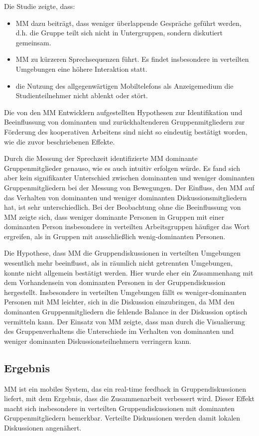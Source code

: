 Die Studie zeigte, dass:

\begin{itemize}
  \item MM dazu beiträgt, dass weniger überlappende Gespräche geführt werden, d.h. die
Gruppe teilt sich nicht in Untergruppen, sondern diskutiert gemeinsam.
  \item MM zu kürzeren Sprechsequenzen führt. Es findet insbesondere in verteilten
Umgebungen eine höhere Interaktion statt.
  \item die Nutzung des allgegenwärtigen Mobiltelefons als Anzeigemedium die
Studienteilnehmer nicht ablenkt oder stört.

\end{itemize}

Die von den MM Entwicklern aufgestellten Hypothesen zur Identifikation und
Beeinflussung von dominanten und zurückhaltenderen Gruppenmitgliedern zur
Förderung des kooperativen Arbeitens sind nicht so eindeutig bestätigt worden,
wie die zuvor beschriebenen Effekte.

Durch die Messung der Sprechzeit identifizierte MM dominante Gruppenmitglieder
genauso, wie es auch intuitiv erfolgen würde. Es fand sich aber kein
signifikanter Unterschied zwischen dominanten und weniger dominanten
Gruppenmitgliedern bei der Messung von Bewegungen.
Der Einfluss, den MM auf das Verhalten von dominanten und weniger dominanten
Diskussionsmitgliedern hat, ist sehr unterschiedlich.
Bei der Beobachtung ohne die Beeinflussung von MM zeigte sich, dass weniger
dominante Personen in Gruppen mit einer dominanten Person insbesondere in
verteilten Arbeitsgruppen häufiger das Wort ergreifen, als in Gruppen mit
ausschließlich wenig-do\-min\-ant\-en Personen.

Die Hypothese, dass MM die Gruppendiskussionen in verteilten Umgebungen
wesentlich mehr beeinflusst, als in räumlich nicht getrennten Umgebungen, konnte
nicht allgemein bestätigt werden. Hier wurde eher ein Zusammenhang mit dem
Vorhandensein von dominanten Personen in der Gruppendiskussion hergestellt.
Insbesondere in verteilten Umgebungen fällt es weniger-dominanten Personen mit
MM leichter, sich in die Diskussion einzubringen, da MM den dominanten
Gruppenmitgliedern die fehlende Balance in der Diskussion optisch vermitteln
kann. 
Der Einsatz von MM zeigte, dass man durch die Visualierung des Gruppenverhaltens
die Unterschiede im Verhalten von dominanten und weniger dominanten
Diskussionsteilnehmern verringern kann.

\subsection{Ergebnis}
MM ist ein mobiles System, das ein real-time feedback in Gruppendiskussionen
liefert, mit dem Ergebnis, dass die Zusammenarbeit verbessert wird.
Dieser Effekt macht sich insbesondere in verteilten Gruppendiskussionen mit
dominanten Gruppenmitgliedern bemerkbar. Verteilte Diskussionen werden damit
lokalen Diskussionen angenähert.


